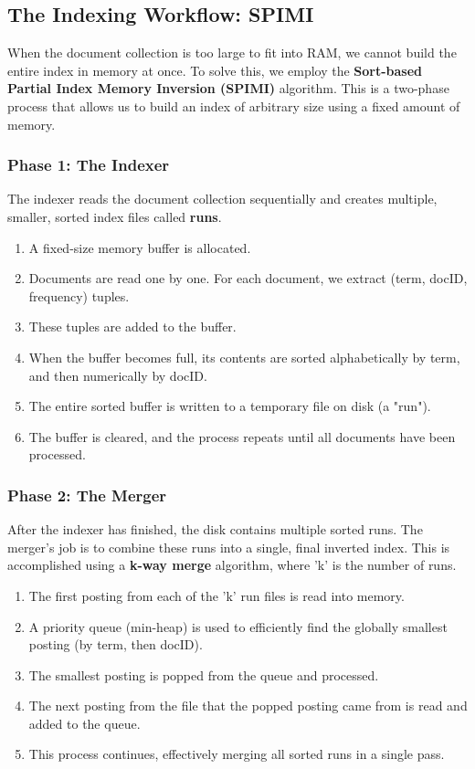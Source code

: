 \documentclass{article}
\begin{document}
\subsection{The Indexing Workflow: SPIMI}
When the document collection is too large to fit into RAM, we cannot build the entire index in memory at once. To solve this, we employ the \textbf{Sort-based Partial Index Memory Inversion (SPIMI)} algorithm. This is a two-phase process that allows us to build an index of arbitrary size using a fixed amount of memory.

\subsubsection{Phase 1: The Indexer}
The indexer reads the document collection sequentially and creates multiple, smaller, sorted index files called \textbf{runs}.
\begin{enumerate}
    \item A fixed-size memory buffer is allocated.
    \item Documents are read one by one. For each document, we extract (term, docID, frequency) tuples.
    \item These tuples are added to the buffer.
    \item When the buffer becomes full, its contents are sorted alphabetically by term, and then numerically by docID.
    \item The entire sorted buffer is written to a temporary file on disk (a "run").
    \item The buffer is cleared, and the process repeats until all documents have been processed.
\end{enumerate}

\subsubsection{Phase 2: The Merger}
After the indexer has finished, the disk contains multiple sorted runs. The merger's job is to combine these runs into a single, final inverted index. This is accomplished using a \textbf{k-way merge} algorithm, where 'k' is the number of runs.
\begin{enumerate}
    \item The first posting from each of the 'k' run files is read into memory.
    \item A priority queue (min-heap) is used to efficiently find the globally smallest posting (by term, then docID).
    \item The smallest posting is popped from the queue and processed.
    \item The next posting from the file that the popped posting came from is read and added to the queue.
    \item This process continues, effectively merging all sorted runs in a single pass.
\end{enumerate}
\end{document}

